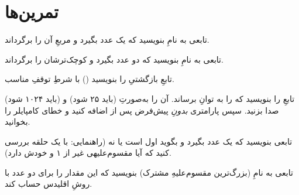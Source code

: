 \section{تمرین‌ها}

\exercise تابعی به نامِ  بنویسید که یک عدد بگیرد و مربعِ آن را
برگرداند.

\exercise تابعی به نامِ  بنویسید که دو عدد بگیرد و کوچک‌ترشان را
برگرداند.

\begin{sloppypar}
\exercise تابعِ بازگشتیِ  را بنویسید
() با شرطِ توقفِ مناسب.
\end{sloppypar}

\exercise تابعِ  را بنویسید که
 را به توانِ  برساند. آن را به‌صورتِ  (باید ۲۵
شود) و  (باید ۱۰۲۴ شود) صدا بزنید. سپس پارامتری \emph{بدونِ}
پیش‌فرض پس از  اضافه کنید و خطای کامپایلر را بخوانید.

\exercise تابعی بنویسید که یک عدد بگیرد و بگوید اول است یا نه (راهنمایی: با یک
حلقه بررسی کنید که آیا مقسوم‌علیهی غیر از ۱ و خودش دارد).

\exercise تابعی به نامِ  (بزرگ‌ترین مقسوم‌علیهِ مشترک) بنویسید که این مقدار را برای دو عدد با روشِ اقلیدس حساب کند.
